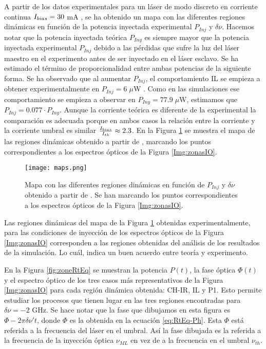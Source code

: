 		A partir de los datos experimentales para un láser de modo discreto en corriente continua $I_{bias} = 30$ mA \cite{Chaves19}, se ha obtenido un mapa con las diferentes regiones dinámicas en función de la potencia inyectada experimental $P_{Inj}$ y $\delta\nu$. Hacemos notar que la potencia inyectada teórica $P_{Iny}$ es siempre mayor que la potencia inyectada experimental $P_{Inj}$ debido a las pérdidas que sufre la luz del láser maestro en el experimento antes de ser inyectado en el láser esclavo. Se ha estimado el término de proporcionalidad entre ambas potencias de la siguiente forma. Se ha observado que al aumentar $P_{Inj}$, el comportamiento IL se empieza a obtener experimentalmente en $P_{Inj} = 6\;\mu$W \cite{Chaves19}. Como en las simulaciones ese comportamiento se empieza a observar en $P_{Iny} = 77.9\;\mu$W, estimamos que $P_{Inj} = 0.077 \cdot P_{Iny}$. Aunque la corriente teórica es diferente de la experimental la comparación es adecuada porque en ambos casos la relación entre la corriente y la corriente umbral es similar $\frac{I_{bias}}{I_{th}} \approx 2.3$. En la Figura \ref{fig:map} se muestra el mapa de las regiones dinámicas obtenido a partir de \cite{Chaves19}, marcando los puntos correspondientes a los espectros ópticos de la Figura \ref{Img:zonasIO}.

			\begin{figure}[H]
				\centering
				\texttt{[image: maps.png]}
				\caption{\label{fig:map}Mapa con las diferentes regiones dinámicas en función de $P_{Inj}$ y $\delta\nu$ obtenido a partir de \cite{Chaves19}. Se han marcando los puntos correspondientes a los espectros ópticos de la Figura \ref{Img:zonasIO}.}
			\end{figure}

		Las regiones dinámicas del mapa de la Figura \ref{fig:map} obtenidas experimentalmente, para las condiciones de inyección de los espectros ópticos de la Figura \ref{Img:zonasIO} corresponden a las regiones obtenidas del análisis de los resultados de la simulación. Lo cuál, indica un buen acuerdo entre teoría y experimento.

		En la Figura \ref{fig:zoneRtEq} se muestran la potencia $P(t)$, la fase óptica $\Phi (t)$ y el espectro óptico de los tres casos más representativos de la Figura \ref{Img:zonasIO} para cada región dinámica obtenida: CH-IR, IL y P1. Esto permite estudiar los procesos que tienen lugar en las tres regiones encontradas para $\delta\nu = -2$ GHz. Se hace notar que la fase que dibujamos en esta figura es $\Phi - 2\pi\delta\nu't$, donde $\Phi$ es la obtenida en la ecuación \ref{eq:RtEq-Ph}. Esta $\Phi$ está referida a la frecuencia del láser en el umbral. Así la fase dibujada es la referida a la frecuencia de la inyección óptica $\nu_{ML}$ en vez de a la frecuencia en el umbral $\nu_{th}$. 

